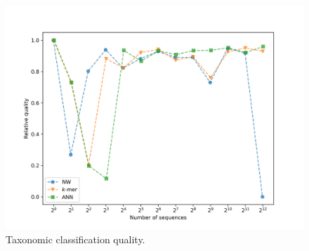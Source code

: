 \documentclass[pdflatex,sn-vancouver-num]{sn-jnl}%
\begin{document}
                \begin{figure}[!htb]
                    \begin{center}
                        \includegraphics[width=\textwidth]{picture_experiment_quality.png}
                    \end{center}
                    \caption{
                        Taxonomic classification quality.
                    }\label{Picture:Experiment:Quality}
                \end{figure}
\end{document}
